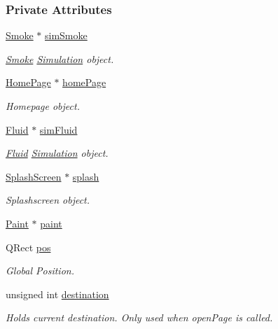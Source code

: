\subsubsection*{Private Attributes}
\begin{DoxyCompactItemize}
\item 
\mbox{\hyperlink{classSmoke}{Smoke}} $\ast$ \mbox{\hyperlink{classStack_a0eb428edacee758da17e9b8a8943db79}{sim\+Smoke}}
\begin{DoxyCompactList}\small\item\em \mbox{\hyperlink{classSmoke}{Smoke}} \mbox{\hyperlink{classSimulation}{Simulation}} object. \end{DoxyCompactList}\item 
\mbox{\hyperlink{classHomePage}{Home\+Page}} $\ast$ \mbox{\hyperlink{classStack_aa1bb5aa087f1766cec2dab2174159194}{home\+Page}}
\begin{DoxyCompactList}\small\item\em Homepage object. \end{DoxyCompactList}\item 
\mbox{\hyperlink{classFluid}{Fluid}} $\ast$ \mbox{\hyperlink{classStack_a528378e89155254d8245e44892e93bd7}{sim\+Fluid}}
\begin{DoxyCompactList}\small\item\em \mbox{\hyperlink{classFluid}{Fluid}} \mbox{\hyperlink{classSimulation}{Simulation}} object. \end{DoxyCompactList}\item 
\mbox{\hyperlink{classSplashScreen}{Splash\+Screen}} $\ast$ \mbox{\hyperlink{classStack_a2d3f7bf6df4a15c81ed677fd728dda4c}{splash}}
\begin{DoxyCompactList}\small\item\em Splashscreen object. \end{DoxyCompactList}\item 
\mbox{\hyperlink{classPaint}{Paint}} $\ast$ \mbox{\hyperlink{classStack_ae20446c30ae36243a42983dcdc371258}{paint}}
\item 
Q\+Rect \mbox{\hyperlink{classStack_a89c03088e1dd8cf4eb333638b059d30a}{pos}}
\begin{DoxyCompactList}\small\item\em Global Position. \end{DoxyCompactList}\item 
unsigned int \mbox{\hyperlink{classStack_a1ef23f9e493b0f9d535eb8282114444d}{destination}}
\begin{DoxyCompactList}\small\item\em Holds current destination. Only used when open\+Page is called. \end{DoxyCompactList}\item 

\end{DoxyCompactItemize}
